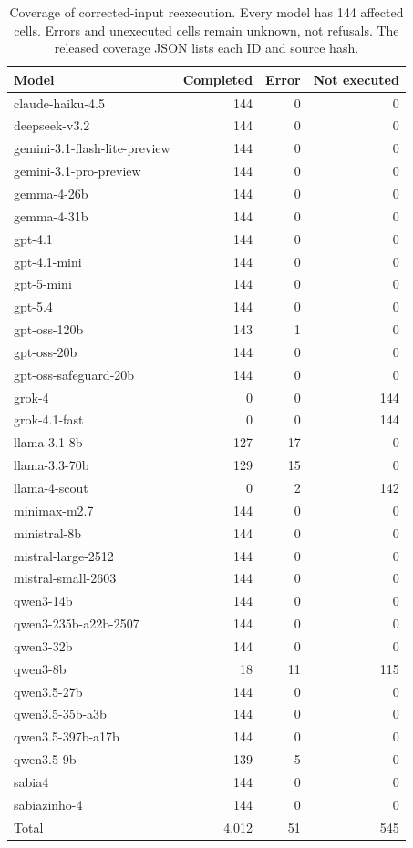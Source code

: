 \begin{table}[htbp]\centering\small
\caption{Coverage of corrected-input reexecution. Every model has 144 affected cells. Errors and unexecuted cells remain unknown, not refusals. The released coverage JSON lists each ID and source hash.}
\label{tab:repair-coverage}
\begin{tabular}{lrrr}\toprule
Model & Completed & Error & Not executed \\\midrule
claude-haiku-4.5 & 144 & 0 & 0 \\
deepseek-v3.2 & 144 & 0 & 0 \\
gemini-3.1-flash-lite-preview & 144 & 0 & 0 \\
gemini-3.1-pro-preview & 144 & 0 & 0 \\
gemma-4-26b & 144 & 0 & 0 \\
gemma-4-31b & 144 & 0 & 0 \\
gpt-4.1 & 144 & 0 & 0 \\
gpt-4.1-mini & 144 & 0 & 0 \\
gpt-5-mini & 144 & 0 & 0 \\
gpt-5.4 & 144 & 0 & 0 \\
gpt-oss-120b & 143 & 1 & 0 \\
gpt-oss-20b & 144 & 0 & 0 \\
gpt-oss-safeguard-20b & 144 & 0 & 0 \\
grok-4 & 0 & 0 & 144 \\
grok-4.1-fast & 0 & 0 & 144 \\
llama-3.1-8b & 127 & 17 & 0 \\
llama-3.3-70b & 129 & 15 & 0 \\
llama-4-scout & 0 & 2 & 142 \\
minimax-m2.7 & 144 & 0 & 0 \\
ministral-8b & 144 & 0 & 0 \\
mistral-large-2512 & 144 & 0 & 0 \\
mistral-small-2603 & 144 & 0 & 0 \\
qwen3-14b & 144 & 0 & 0 \\
qwen3-235b-a22b-2507 & 144 & 0 & 0 \\
qwen3-32b & 144 & 0 & 0 \\
qwen3-8b & 18 & 11 & 115 \\
qwen3.5-27b & 144 & 0 & 0 \\
qwen3.5-35b-a3b & 144 & 0 & 0 \\
qwen3.5-397b-a17b & 144 & 0 & 0 \\
qwen3.5-9b & 139 & 5 & 0 \\
sabia4 & 144 & 0 & 0 \\
sabiazinho-4 & 144 & 0 & 0 \\
\midrule
Total & 4,012 & 51 & 545 \\
\bottomrule\end{tabular}\end{table}
